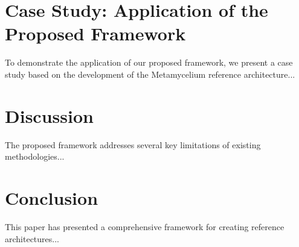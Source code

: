 \documentclass[12pt,a4paper]{article}
\begin{document}
\section{Case Study: Application of the Proposed Framework}
\label{sec:case-study}
To demonstrate the application of our proposed framework, we present a case study based on the development of the Metamycelium reference architecture...

\section{Discussion}
\label{sec:discussion}
The proposed framework addresses several key limitations of existing methodologies...

\section{Conclusion}
\label{sec:conclusion}
This paper has presented a comprehensive framework for creating reference architectures...



\end{document}
